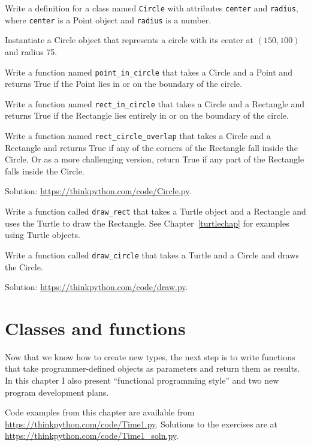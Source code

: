 \documentclass[10pt]{book}
\begin{document}
\begin{exercise}

Write a definition for a class named {\tt Circle} with attributes
{\tt center} and {\tt radius}, where {\tt center} is a Point object
and {\tt radius} is a number.

Instantiate a Circle object that represents a circle with its center
at $(150, 100)$ and radius 75.

Write a function named \verb"point_in_circle" that takes a Circle and
a Point and returns True if the Point lies in or on the boundary of
the circle.

Write a function named \verb"rect_in_circle" that takes a Circle and a
Rectangle and returns True if the Rectangle lies entirely in or on the boundary
of the circle.

Write a function named \verb"rect_circle_overlap" that takes a Circle
and a Rectangle and returns True if any of the corners of the Rectangle fall
inside the Circle.  Or as a more challenging version, return True if
any part of the Rectangle falls inside the Circle.

Solution: \url{https://thinkpython.com/code/Circle.py}.

\end{exercise}


\begin{exercise}

Write a function called \verb"draw_rect" that takes a Turtle object
and a Rectangle and uses the Turtle to draw the Rectangle.  See
Chapter~\ref{turtlechap} for examples using Turtle objects.

Write a function called \verb"draw_circle" that takes a Turtle and
a Circle and draws the Circle.

Solution: \url{https://thinkpython.com/code/draw.py}.

\end{exercise}



\chapter{Classes and functions}
\label{time}

Now that we know how to create new types, the next
step is to write functions that take programmer-defined objects
as parameters and return them as results.  In this chapter I
also present ``functional programming style'' and two new
program development plans.

Code examples from this chapter are available from
\url{https://thinkpython.com/code/Time1.py}.
Solutions to the exercises are at
\url{https://thinkpython.com/code/Time1_soln.py}.
\end{document}
